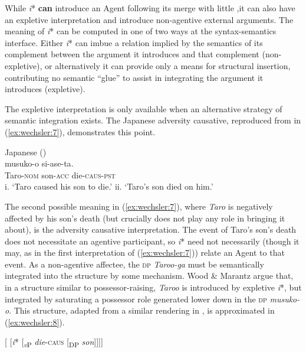 \documentclass[output=paper,modfonts,nonflat,colorlinks,citecolor=brown]{langsci/langscibook}
\begin{document}
While \textit{i}* \textbf{can} introduce an Agent following its merge with little {\liv},it can also have an expletive interpretation and introduce non-agentive external arguments. The meaning of \textit{i}* can be computed in one of two ways at the syntax-semantics interface. Either \textit{i}* can imbue a relation implied by the semantics of its complement between the argument it introduces and that complement (non-expletive), or alternatively it can provide only a means for structural insertion, contributing no semantic “glue” to assist in integrating the argument it introduces (expletive).

The expletive interpretation is only available when an alternative strategy of semantic integration exists. The Japanese adversity causative, reproduced from \citeauthor{WoodMarantz2017} in (\ref{ex:wechsler:7}), demonstrates this point.

\ea\label{ex:wechsler:7}
Japanese (\citealt[274]{WoodMarantz2017})\\
 {musuko-o} {si-ase-ta}.\\
Taro-\textsc{nom}  son-\textsc{acc}  die-\textsc{caus-pst}\\
\glt i. ‘Taro caused his son to die.’
\glt ii. ‘Taro’s son died on him.'
\z

The second possible meaning in (\ref{ex:wechsler:7}), where \textit{Taro} is negatively affected by his son’s death (but crucially does not play any role in bringing it about), is the adversity causative interpretation. The event of Taro’s son’s death does not necessitate an agentive participant, so \textit{i}* need not necessarily (though it may, as in the first interpretation of (\ref{ex:wechsler:7})) relate an Agent to that event. As a non-agentive affectee, the \textsc{dp} \textit{Taroo-ga} must be semantically integrated into the structure by some mechanism. Wood \& Marantz argue that, in a structure similar to possessor-raising, \textit{Taroo} is introduced by expletive \textit{i}*, but integrated by saturating a possessor role generated lower down in the \textsc{dp} \textit{musuko-o}. This structure, adapted from a similar rendering in  \citet[274]{WoodMarantz2017}, is approximated in (\ref{ex:wechsler:8}).

\newpage

\ea\label{ex:wechsler:8}
{[\textit{} [\textit{i}* [\textsubscript{\textit{v}P} \textit{die}-\textsc{caus} [\textsubscript{DP} \textsc{} \textit{son}]]]]} \\
\end{document}
